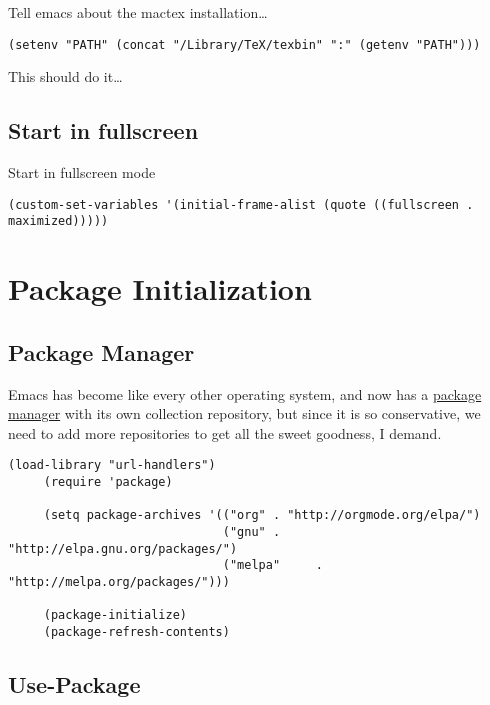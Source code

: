 \documentclass[12pt]{article}
\begin{document}
Tell emacs about the mactex installation\ldots{}

\lstset{language=Lisp,label= ,caption= ,numbers=none}
\begin{lstlisting}
(setenv "PATH" (concat "/Library/TeX/texbin" ":" (getenv "PATH")))
\end{lstlisting}

This should do it\ldots{}




\subsection{Start in fullscreen}
\label{sec-1-7}

Start in fullscreen mode

\lstset{language=Lisp,label= ,caption= ,numbers=none}
\begin{lstlisting}
(custom-set-variables '(initial-frame-alist (quote ((fullscreen . maximized)))))
\end{lstlisting}

\section{Package Initialization}
\label{sec-2}
\subsection{Package Manager}
\label{sec-2-1}

Emacs has become like every other operating system, and now has a
\href{http://tromey.com/elpa/}{package manager} with its own collection repository, but since it is
so conservative, we need to add more repositories to get all the
sweet goodness, I demand.

\lstset{language=Lisp,label= ,caption= ,numbers=none}
\begin{lstlisting}
(load-library "url-handlers")
     (require 'package)

     (setq package-archives '(("org" . "http://orgmode.org/elpa/")
                              ("gnu" . "http://elpa.gnu.org/packages/")
                              ("melpa"     . "http://melpa.org/packages/")))

     (package-initialize)
     (package-refresh-contents)
\end{lstlisting}

\subsection{Use-Package}
\label{sec-2-2}
\end{document}
